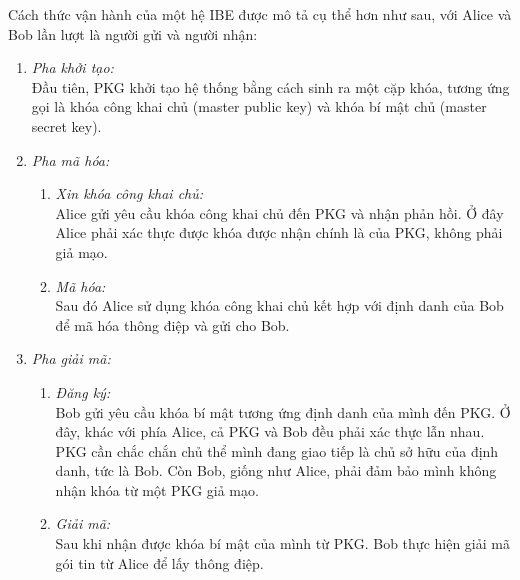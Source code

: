\documentclass[class=report, crop=false]{standalone}
\begin{document}
		Cách thức vận hành của một hệ IBE được mô tả cụ thể hơn như sau, với Alice và Bob lần lượt là người gửi và người nhận:
		\vspace{-0.5cm}
		\begin{enumerate}
			\item \textit{Pha khởi tạo:} \\[0.2\baselineskip]
			Đầu tiên, PKG khởi tạo hệ thống bằng cách sinh ra một cặp khóa, tương ứng gọi là khóa công khai chủ (master public key) và khóa bí mật chủ (master secret key).
			\item \textit{Pha mã hóa:}
			\begin{enumerate}
				\item \textit{Xin khóa công khai chủ:} \\
				Alice gửi yêu cầu khóa công khai chủ đến PKG và nhận phản hồi. Ở đây Alice phải xác thực được khóa được nhận chính là của PKG, không phải giả mạo.
				\item \textit{Mã hóa:} \\
				Sau đó Alice sử dụng khóa công khai chủ kết hợp với định danh của Bob để mã hóa thông điệp và gửi cho Bob.
			\end{enumerate}
			\item \textit{Pha giải mã:}
			\begin{enumerate}
				\item \textit{Đăng ký:} \\
				Bob gửi yêu cầu khóa bí mật tương ứng định danh của mình đến PKG. Ở đây, khác với phía Alice, cả PKG và Bob đều phải xác thực lẫn nhau. PKG cần chắc chắn chủ thể mình đang giao tiếp là chủ sở hữu của định danh, tức là Bob. Còn Bob, giống như Alice, phải đảm bảo mình không nhận khóa từ một PKG giả mạo.
				\item \textit{Giải mã:} \\
				Sau khi nhận được khóa bí mật của mình từ PKG. Bob thực hiện giải mã gói tin từ Alice để lấy thông điệp.
			\end{enumerate}
		\end{enumerate}
		
\end{document}

